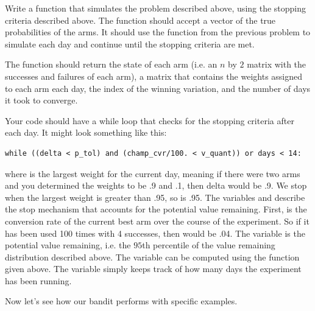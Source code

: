 \begin{problem}
Write a function that simulates the problem described above, using the stopping criteria described above.
The function should accept a vector of the true probabilities of the arms.
It should use the function from the previous problem to simulate each day and
continue until the stopping criteria are met.

The function should return the state of each arm (i.e. an $n$ by $2$ matrix with the
successes and failures of each arm), a matrix that contains the weights assigned to
each arm each day, the index of the winning variation, and the number of days it took to converge.

Your code should have a while loop that checks for the stopping criteria after each day.
It might look something like this:
\begin{lstlisting}
while ((delta < p_tol) and (champ_cvr/100. < v_quant)) or days < 14:
\end{lstlisting}
where  is the largest weight for the current day, meaning if there were two arms and you determined the weights to be .9 and .1, then delta would be .9.  We stop when the largest weight is greater than .95, so  is .95.  The variables  and  describe the stop mechanism that accounts for the potential value remaining.  First,  is the conversion rate of the current best arm over the course of the experiment.  So if it has been used 100 times with 4 successes, then  would be .04.  The variable  is the potential value remaining, i.e. the $95$th percentile of the value remaining distribution described above.  The variable  can be computed using the  function given above.
The  variable simply keeps track of how many days the experiment has been running.
\end{problem}

Now let's see how our bandit performs with specific examples.

